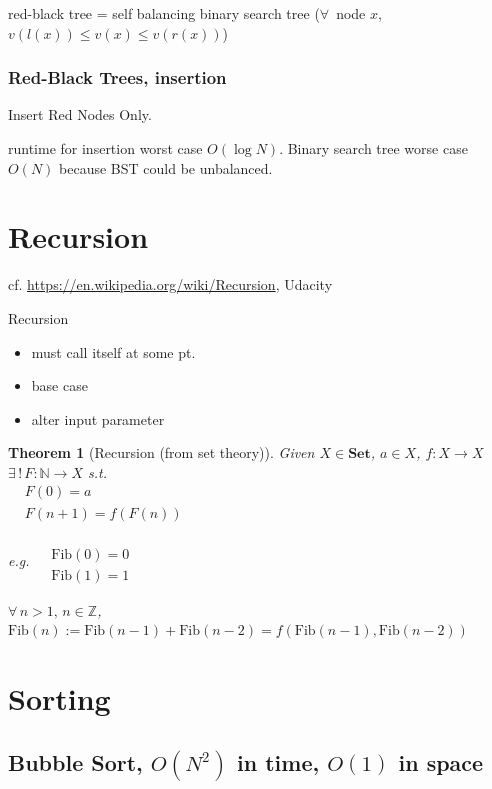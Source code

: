 \documentclass[10pt]{amsart}
\newtheorem{theorem}{Theorem}
\begin{document}
\begin{multicols*}{2}
red-black tree = self balancing binary search tree ($\forall \, $ node $x$, $v(l(x)) \leq v(x) \leq v(r(x))$)

\subsubsection{Red-Black Trees, insertion}

Insert Red Nodes Only. 

runtime for insertion worst case $O(\log{N})$. Binary search tree worse case $O(N)$ because BST could be unbalanced. 


\section{Recursion}

cf. \url{https://en.wikipedia.org/wiki/Recursion},  Udacity 

Recursion
\begin{itemize}
	\item must call itself at some pt.
	\item base case
	\item alter input parameter
\end{itemize}

\begin{theorem}[Recursion (from set theory)]
Given $X \in \textbf{Set}$, $a\in X$, $f:X \to X$ \\
$\exists \, ! \, F: \mathbb{N} \to X$ s.t. \\
$\begin{aligned}
& F(0) = a \\
& F(n+1) = f(F(n))
\end{aligned}$

e.g. $\begin{aligned} & \quad \\ 
	& \text{Fib}(0) = 0  \\
	& \text{Fib}(1) = 1 \end{aligned}$ 
	
	$\forall \, n > 1, \, n \in \mathbb{Z}$, $\text{Fib}(n) := \text{Fib}(n-1) + \text{Fib}(n-2) = f(\text{Fib}(n-1), \text{Fib}(n-2))$
\end{theorem} 


\section{Sorting}

\subsection{Bubble Sort, $O(N^2)$ in time, $O(1)$ in space}


\end{multicols*}
\end{document}
